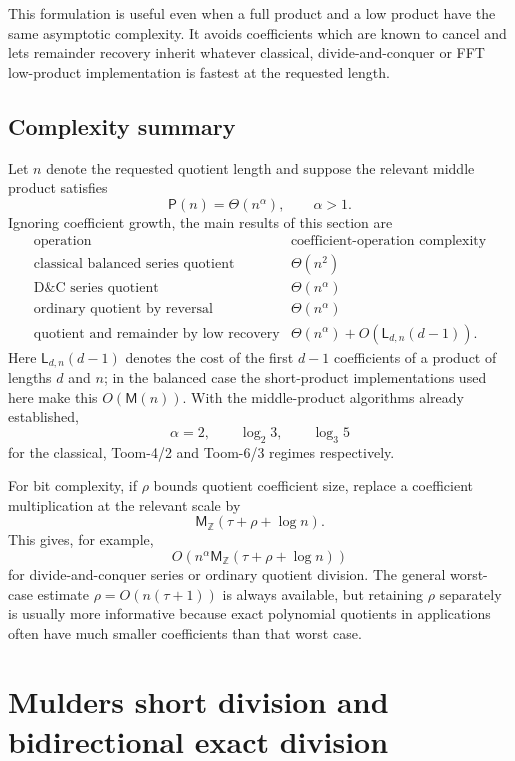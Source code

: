 \documentclass[11pt]{book}
\theoremstyle{definition}
\newcommand{\ZZ}{\mathbb Z}
\newcommand{\MZ}{\mathsf M_{\ZZ}}
\begin{document}
This formulation is useful even when a full product and a low product have the
same asymptotic complexity.  It avoids coefficients which are known to cancel
and lets remainder recovery inherit whatever classical, divide-and-conquer or
FFT low-product implementation is fastest at the requested length.

\subsection{Complexity summary}

Let $n$ denote the requested quotient length and suppose the relevant middle
product satisfies
\[
 \mathsf P(n)=\Theta(n^\alpha),\qquad \alpha>1.
\]
Ignoring coefficient growth, the main results of this section are
\[
\begin{array}{c|c}
\text{operation} & \text{coefficient-operation complexity}\\
\hline
\text{classical balanced series quotient} & \Theta(n^2)\\
\text{D\&C series quotient} & \Theta(n^\alpha)\\
\text{ordinary quotient by reversal} & \Theta(n^\alpha)\\
\text{quotient and remainder by low recovery} &
 \Theta(n^\alpha)+O(\mathsf L_{d,n}(d-1)).
\end{array}
\]
Here $\mathsf L_{d,n}(d-1)$ denotes the cost of the first $d-1$
coefficients of a product of lengths $d$ and $n$; in the balanced case the
short-product implementations used here make this $O(\mathsf M(n))$.  With
the middle-product algorithms already established,
\[
 \alpha=2,\qquad \log_2 3,\qquad \log_3 5
\]
for the classical, Toom-4/2 and Toom-6/3 regimes respectively.

For bit complexity, if $\rho$ bounds quotient coefficient size, replace a
coefficient multiplication at the relevant scale by
\[
 \MZ(\tau+\rho+\log n).
\]
This gives, for example,
\[
 O\!\left(n^\alpha\MZ(\tau+\rho+\log n)\right)
\]
for divide-and-conquer series or ordinary quotient division.  The general
worst-case estimate $\rho=O(n(\tau+1))$ is always available, but retaining
$\rho$ separately is usually more informative because exact polynomial
quotients in applications often have much smaller coefficients than that
worst case.

\section{Mulders short division and bidirectional exact division}
\end{document}
